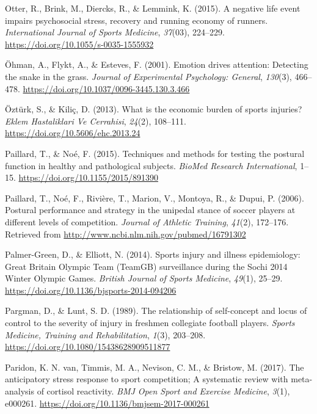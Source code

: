 \documentclass[
  english,
  man,floatsintext]{apa6}
\begin{document}
\leavevmode\hypertarget{ref-Otter2015}{}%
Otter, R., Brink, M., Diercks, R., \& Lemmink, K. (2015). A negative life event impairs psychosocial stress, recovery and running economy of runners. \emph{International Journal of Sports Medicine}, \emph{37}(03), 224--229. \url{https://doi.org/10.1055/s-0035-1555932}

\leavevmode\hypertarget{ref-Ohman2001}{}%
Öhman, A., Flykt, A., \& Esteves, F. (2001). Emotion drives attention: Detecting the snake in the grass. \emph{Journal of Experimental Psychology: General}, \emph{130}(3), 466--478. \url{https://doi.org/10.1037/0096-3445.130.3.466}

\leavevmode\hypertarget{ref-Ozturk2013}{}%
Öztürk, S., \& Kiliç, D. (2013). What is the economic burden of sports injuries? \emph{Eklem Hastaliklari Ve Cerrahisi}, \emph{24}(2), 108--111. \url{https://doi.org/10.5606/ehc.2013.24}

\leavevmode\hypertarget{ref-Paillard2015}{}%
Paillard, T., \& Noé, F. (2015). Techniques and methods for testing the postural function in healthy and pathological subjects. \emph{BioMed Research International}, 1--15. \url{https://doi.org/10.1155/2015/891390}

\leavevmode\hypertarget{ref-Paillard2006}{}%
Paillard, T., Noé, F., Rivière, T., Marion, V., Montoya, R., \& Dupui, P. (2006). Postural performance and strategy in the unipedal stance of soccer players at different levels of competition. \emph{Journal of Athletic Training}, \emph{41}(2), 172--176. Retrieved from \url{http://www.ncbi.nlm.nih.gov/pubmed/16791302}

\leavevmode\hypertarget{ref-Palmer-Green2014}{}%
Palmer-Green, D., \& Elliott, N. (2014). Sports injury and illness epidemiology: Great Britain Olympic Team (TeamGB) surveillance during the Sochi 2014 Winter Olympic Games. \emph{British Journal of Sports Medicine}, \emph{49}(1), 25--29. \url{https://doi.org/10.1136/bjsports-2014-094206}

\leavevmode\hypertarget{ref-Pargman1989}{}%
Pargman, D., \& Lunt, S. D. (1989). The relationship of self-concept and locus of control to the severity of injury in freshmen collegiate football players. \emph{Sports Medicine, Training and Rehabilitation}, \emph{1}(3), 203--208. \url{https://doi.org/10.1080/15438628909511877}

\leavevmode\hypertarget{ref-VanParidon2017}{}%
Paridon, K. N. van, Timmis, M. A., Nevison, C. M., \& Bristow, M. (2017). The anticipatory stress response to sport competition; A systematic review with meta-analysis of cortisol reactivity. \emph{BMJ Open Sport and Exercise Medicine}, \emph{3}(1), e000261. \url{https://doi.org/10.1136/bmjsem-2017-000261}
\end{document}
